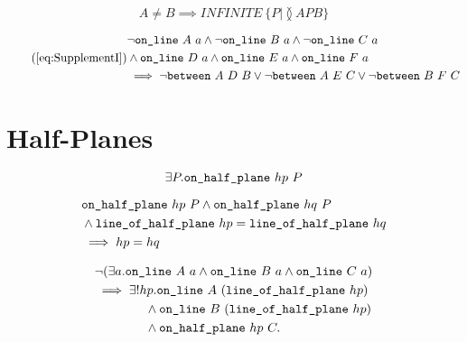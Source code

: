 \begin{equation}
  A \neq B \implies INFINITE\ \{ P \vert \between{A}{P}{B} \}
\end{equation}

\begin{equation}\tag{\ref{eq:SupplementI}}
  \begin{split}
    &\neg\code{on\_line}\ A\ a \wedge \neg\code{on\_line}\ B\ a \wedge \neg\code{on\_line}\ C\ a\\
    &\wedge \code{on\_line}\ D\ a \wedge \code{on\_line}\ E\ a \wedge \code{on\_line}\ F\ a\\
    &\implies \neg\between{A}{D}{B} \vee \neg\between{A}{E}{C} \vee \neg\between{B}{F}{C}
  \end{split}
\end{equation}

\section{Half-Planes}
\begin{equation*}
  \exists P. \texttt{on\_half\_plane}\ hp\ P
\end{equation*}

\begin{equation*}
  \begin{split}
    &\texttt{on\_half\_plane}\ hp\ P \wedge \texttt{on\_half\_plane}\ hq\ P\\
    &\wedge\texttt{line\_of\_half\_plane}\ hp = \texttt{line\_of\_half\_plane}\ hq\\
    &\implies hp = hq
  \end{split}
\end{equation*}

\begin{equation*}
  \begin{split}
    &\neg(\exists a.\texttt{on\_line}\ A\ a\wedge \texttt{on\_line}\ B\ a\wedge \texttt{on\_line}\ C\ a)\\
    &\implies \exists! hp. \texttt{on\_line}\ A\ (\texttt{line\_of\_half\_plane}\ hp)\\
    &\qquad\qquad\wedge\texttt{on\_line}\ B\ (\texttt{line\_of\_half\_plane}\ hp)\\
    &\qquad\qquad\wedge\texttt{on\_half\_plane}\ hp\ C.
\end{split}
\end{equation*}

